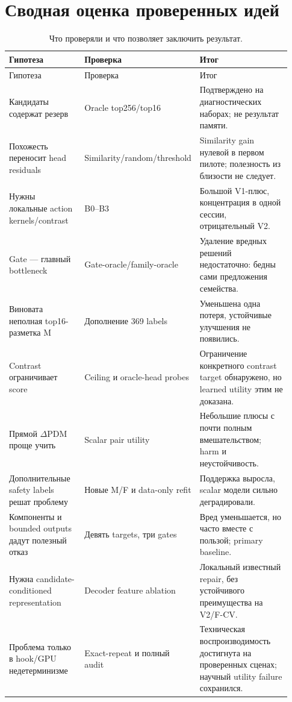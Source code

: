 \documentclass[11pt,a4paper]{article}
\begin{document}
\section{Сводная оценка проверенных идей}
\begin{longtable}{@{}p{0.27\linewidth}p{0.33\linewidth}p{0.33\linewidth}@{}}
\caption{Что проверяли и что позволяет заключить результат.}\label{tab:hypotheses}\\
\toprule Гипотеза & Проверка & Итог\\\midrule\endfirsthead
\toprule Гипотеза & Проверка & Итог\\\midrule\endhead
Кандидаты содержат резерв & Oracle top256/top16 & Подтверждено на диагностических наборах; не результат памяти.\\
Похожесть переносит head residuals & Similarity/random/threshold & Similarity gain нулевой в первом пилоте; полезность из близости не следует.\\
Нужны локальные action kernels/contrast & B0--B3 & Большой V1-плюс, концентрация в одной сессии, отрицательный V2.\\
Gate --- главный bottleneck & Gate-oracle/family-oracle & Удаление вредных решений недостаточно: бедны сами предложения семейства.\\
Виновата неполная top16-разметка M & Дополнение 369 labels & Уменьшена одна потеря, устойчивые улучшения не появились.\\
Contrast ограничивает score & Ceiling и oracle-head probes & Ограничение конкретного contrast target обнаружено, но learned utility этим не доказана.\\
Прямой $\Delta$PDM проще учить & Scalar pair utility & Небольшие плюсы с почти полным вмешательством; harm и неустойчивость.\\
Дополнительные safety labels решат проблему & Новые M/F и data-only refit & Поддержка выросла, scalar модели сильно деградировали.\\
Компоненты и bounded outputs дадут полезный отказ & Девять targets, три gates & Вред уменьшается, но часто вместе с пользой; primary baseline.\\
Нужна candidate-conditioned representation & Decoder feature ablation & Локальный известный repair, без устойчивого преимущества на V2/F-CV.\\
Проблема только в hook/GPU недетерминизме & Exact-repeat и полный audit & Техническая воспроизводимость достигнута на проверенных сценах; научный utility failure сохранился.\\
\bottomrule
\end{longtable}
\end{document}
